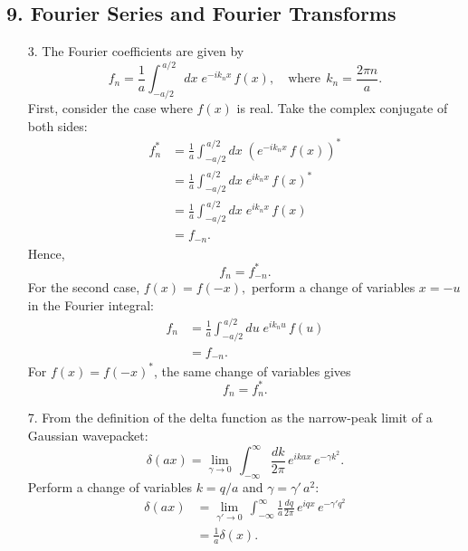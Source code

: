 \documentclass[10pt,a4paper]{article}
\begin{document}
\subsection*{9. Fourier Series and Fourier Transforms}

\begin{enumerate}
\item[3.]
The Fourier coefficients are given by
\begin{equation}
  f_n = \frac{1}{a} \int_{-a/2}^{\,a/2} dx\; e^{-i k_n x}\, f(x), \quad \mathrm{where}\;\, k_n = \frac{2\pi n}{a}.
\end{equation}
First, consider the case where $f(x)$ is real. Take the complex
conjugate of both sides:
\begin{align}
  f_n^* &= \frac{1}{a} \int_{-a/2}^{\,a/2} dx\; \left(e^{-i k_n x}\, f(x)\right)^* \\
  &= \frac{1}{a} \int_{-a/2}^{\,a/2} dx\; e^{i k_n x}\, f(x)^* \\
  &= \frac{1}{a} \int_{-a/2}^{\,a/2} dx\; e^{i k_n x}\, f(x) \\
  &= f_{-n}.
\end{align}
Hence,
\begin{equation}
  f_{n} = f_{-n}^*.
\end{equation}
For the second case, $f(x) = f(-x),$ perform a change of variables $x
= -u$ in the Fourier integral:
\begin{align}
  f_n &= \frac{1}{a} \int_{-a/2}^{\,a/2} du\; e^{i k_n u}\, f(u) \\
  &= f_{-n}.
\end{align}
For $f(x) = f(-x)^*$, the same change of variables gives
\begin{equation}
  f_n = f_n^*.
\end{equation}

\item[7.]
From the definition of the delta function as the narrow-peak limit of a
Gaussian wavepacket:
\begin{equation}
  \delta(ax) = \lim_{\gamma \rightarrow 0} \, \int_{-\infty}^\infty \frac{dk}{2\pi} \, e^{ikax} \, e^{-\gamma k^2}.
\end{equation}
Perform a change of variables $k = q/a$ and $\gamma = \gamma' \, a^2$:
\begin{align}
  \delta(ax) &= \lim_{\gamma' \rightarrow 0} \, \int_{-\infty}^\infty \frac{1}{a}\frac{dq}{2\pi} \, e^{iqx} \, e^{-\gamma' q^2} \\
  &= \frac{1}{a} \delta(x).
\end{align}


\end{enumerate}
\end{document}
